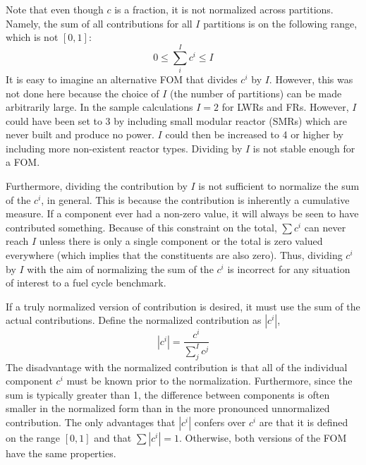 Note that even though $c$ is a fraction, it is not normalized across 
partitions. Namely, the sum of all contributions for all $I$ partitions
is on the following range, which is not $[0, 1]$:
\begin{equation}
\label{sum-c-range}
0 \le \sum_i^I c^i \le I
\end{equation}
It is easy to imagine an alternative FOM that divides $c^i$ by $I$. However, 
this was not done here because the choice of $I$ (the number of partitions)
can be made arbitrarily large.  In the sample calculations $I=2$ for LWRs and
FRs.  However, $I$ could have been set to 3 by including small modular reactor
(SMRs) which are never built and produce no power.  $I$ could then be 
increased to 4 or higher by including more non-existent reactor types.
Dividing by $I$ is not stable enough for a FOM.

Furthermore, dividing the contribution by $I$ is not sufficient to 
normalize the sum of the $c^i$, in general.  This is because the 
contribution is inherently a cumulative measure. If a component ever had a 
non-zero value, it will always be seen to have contributed something. 
Because of this constraint on the total, $\sum c^i$ can never
reach $I$ unless there is only a single component or the 
total is zero valued everywhere (which implies that the constituents are also 
zero). Thus, dividing $c^i$ by $I$ with the aim of normalizing the 
sum of the $c^i$ is incorrect for any situation of interest to a fuel 
cycle benchmark.

If a truly normalized version of contribution is desired, it must 
use the sum of the actual contributions. Define the normalized contribution 
as $|c^i|$, 
\begin{equation}
\label{norm-ci}
\left|c^i\right| = \frac{c^i}{\sum_j^I c^j}
\end{equation}
The disadvantage with the normalized contribution is that all of the 
individual component $c^i$ must be known prior to the normalization. 
Furthermore, since the sum is typically greater than 1, the difference 
between components is often smaller in the normalized form than in the
more pronounced unnormalized contribution.
The only advantages that $|c^i|$ confers over $c^i$ are that it is defined on 
the range $[0,1]$ and that $\sum |c^i| = 1$. Otherwise, both versions of the FOM
have the same properties.

